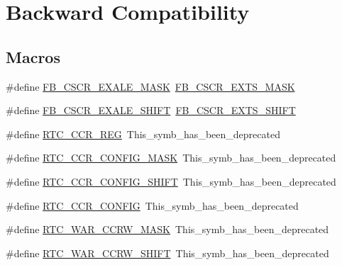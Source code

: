 \hypertarget{group___backward___compatibility___symbols}{}\section{Backward Compatibility}
\label{group___backward___compatibility___symbols}
\subsection*{Macros}
\begin{DoxyCompactItemize}
\item 
\#define \hyperlink{group___backward___compatibility___symbols_ga330f19347b3218e6273f9b4841b5ec88}{F\+B\+\_\+\+C\+S\+C\+R\+\_\+\+E\+X\+A\+L\+E\+\_\+\+M\+A\+SK}~\hyperlink{group___f_b___register___masks_ga1bc7960fd554faa076ba6e34fddaf081}{F\+B\+\_\+\+C\+S\+C\+R\+\_\+\+E\+X\+T\+S\+\_\+\+M\+A\+SK}
\item 
\#define \hyperlink{group___backward___compatibility___symbols_gac912eb6a0ffed6c2d88c59e002632be9}{F\+B\+\_\+\+C\+S\+C\+R\+\_\+\+E\+X\+A\+L\+E\+\_\+\+S\+H\+I\+FT}~\hyperlink{group___f_b___register___masks_ga095a10ba51cbcdf10aca9bf9d5692613}{F\+B\+\_\+\+C\+S\+C\+R\+\_\+\+E\+X\+T\+S\+\_\+\+S\+H\+I\+FT}
\item 
\#define \hyperlink{group___backward___compatibility___symbols_ga568eebd11b2b00084a94f3de4ab02c6a}{R\+T\+C\+\_\+\+C\+C\+R\+\_\+\+R\+EG}~This\+\_\+symb\+\_\+has\+\_\+been\+\_\+deprecated
\item 
\#define \hyperlink{group___backward___compatibility___symbols_ga2af2c9c33277b23542c55ad751de1c53}{R\+T\+C\+\_\+\+C\+C\+R\+\_\+\+C\+O\+N\+F\+I\+G\+\_\+\+M\+A\+SK}~This\+\_\+symb\+\_\+has\+\_\+been\+\_\+deprecated
\item 
\#define \hyperlink{group___backward___compatibility___symbols_gab9af1620804e6b6f3fcd583236fe9196}{R\+T\+C\+\_\+\+C\+C\+R\+\_\+\+C\+O\+N\+F\+I\+G\+\_\+\+S\+H\+I\+FT}~This\+\_\+symb\+\_\+has\+\_\+been\+\_\+deprecated
\item 
\#define \hyperlink{group___backward___compatibility___symbols_gacbb11b1e90585e921482f390c741fcc7}{R\+T\+C\+\_\+\+C\+C\+R\+\_\+\+C\+O\+N\+F\+IG}~This\+\_\+symb\+\_\+has\+\_\+been\+\_\+deprecated
\item 
\#define \hyperlink{group___backward___compatibility___symbols_ga4fb7d8763b4152adb0abc2add17fe3e7}{R\+T\+C\+\_\+\+W\+A\+R\+\_\+\+C\+C\+R\+W\+\_\+\+M\+A\+SK}~This\+\_\+symb\+\_\+has\+\_\+been\+\_\+deprecated
\item 
\#define \hyperlink{group___backward___compatibility___symbols_ga4850a9788a57e8f73c3d588728864308}{R\+T\+C\+\_\+\+W\+A\+R\+\_\+\+C\+C\+R\+W\+\_\+\+S\+H\+I\+FT}~This\+\_\+symb\+\_\+has\+\_\+been\+\_\+deprecated

\end{DoxyCompactItemize}
